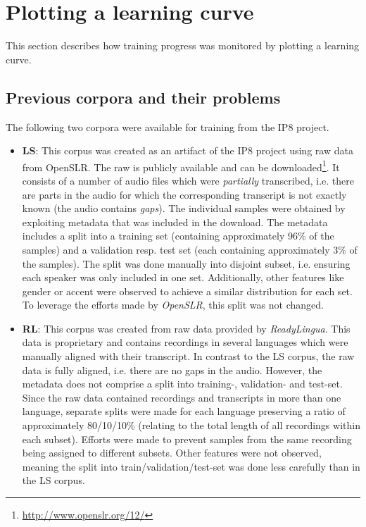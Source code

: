 \section{Plotting a learning curve}

This section describes how training progress was monitored by plotting a learning curve.

\subsection{Previous corpora and their problems}

The following two corpora were available for training from the IP8 project.

\begin{itemize}
	\item \textbf{\ac{LS}}: This corpus was created as an artifact of the IP8 project using raw data from OpenSLR. The raw is publicly available and can be downloaded\footnote{\url{http://www.openslr.org/12/}}. It consists of a number of audio files which were \textit{partially} transcribed, i.e. there are parts in the audio for which the corresponding transcript is not exactly known (the audio contains \textit{gaps}). The individual samples were obtained by exploiting metadata that was included in the download. The metadata includes a split into a training set (containing approximately 96\% of the samples) and a validation resp. test set (each containing approximately 3\% of the samples). The split was done manually into disjoint subset, i.e. ensuring each speaker was only included in one set. Additionally, other features like gender or accent were observed to achieve a similar distribution for each set. To leverage the efforts made by \textit{OpenSLR}, this split was not changed.
	\item \textbf{\ac{RL}}: This corpus was created from raw data provided by \textit{ReadyLingua}. This data is proprietary and contains recordings in several languages which were manually aligned with their transcript. In contrast to the \ac{LS} corpus, the raw data is fully aligned, i.e. there are no gaps in the audio. However, the metadata does not comprise a split into training-, validation- and test-set. Since the raw data contained recordings and transcripts in more than one language, separate splits were made for each language preserving a ratio of approximately 80/10/10\% (relating to the total length of all recordings within each subset). Efforts were made to prevent samples from the same recording being assigned to different subsets. Other features were not observed, meaning the split into train/validation/test-set was done less carefully than in the \ac{LS} corpus.
\end{itemize}

